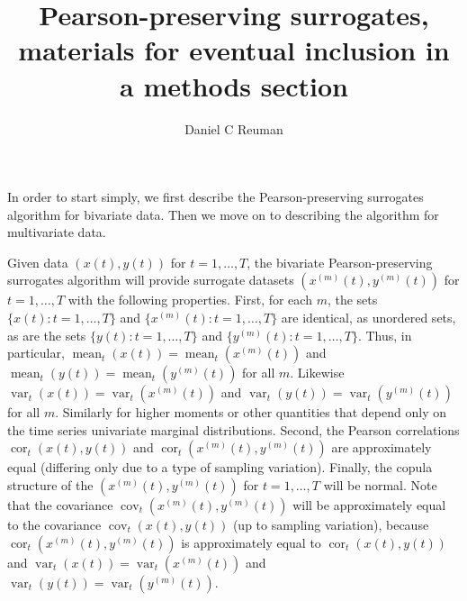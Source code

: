 \documentclass[letterpaper,11pt]{article}
\newcommand{\mean}{\operatorname{mean}}
\newcommand{\var}{\operatorname{var}}
\newcommand{\cor}{\operatorname{cor}}
\newcommand{\cov}{\operatorname{cov}}
\begin{document}
\title{Pearson-preserving surrogates, materials for eventual inclusion in a methods section}
\author{Daniel C Reuman}
\maketitle



\noindent In order to start simply, we first describe the Pearson-preserving surrogates 
algorithm for bivariate data. Then we move on to describing the algorithm
for multivariate data. 

Given data $(x(t),y(t))$ for $t=1,\ldots,T$, the bivariate
Pearson-preserving surrogates algorithm will provide surrogate datasets
$(x^{(m)}(t),y^{(m)}(t))$ for $t=1,\ldots,T$ with the following properties.
First, for each $m$,
the sets $\{x(t) : t=1,\ldots,T\}$ and $\{x^{(m)}(t) : t=1,\ldots,T\}$
are identical, as unordered sets, as are the sets 
$\{y(t) : t=1,\ldots,T\}$ and $\{y^{(m)}(t) : t=1,\ldots,T\}$. Thus,
in particular, $\mean_t(x(t))=\mean_t(x^{(m)}(t))$ and 
$\mean_t(y(t))=\mean_t(y^{(m)}(t))$ for all $m$. Likewise
$\var_t(x(t))=\var_t(x^{(m)}(t))$ and 
$\var_t(y(t))=\var_t(y^{(m)}(t))$ for all $m$. Similarly for
higher moments or other quantities that depend only on the time series
univariate marginal distributions.
Second, the Pearson correlations $\cor_t(x(t),y(t))$
and $\cor_t(x^{(m)}(t),y^{(m)}(t))$ are approximately equal (differing 
only due to a type of sampling variation). Finally, the copula 
structure of the $(x^{(m)}(t),y^{(m)}(t))$ for $t=1,\ldots,T$
will be normal. Note that the covariance
$\cov_t(x^{(m)}(t),y^{(m)}(t))$ will be approximately equal to the covariance
$\cov_t(x(t),y(t))$ (up to sampling variation), because 
$\cor_t(x^{(m)}(t),y^{(m)}(t))$ is approximately equal to 
$\cor_t(x(t),y(t))$ and $\var_t(x(t))=\var_t(x^{(m)}(t))$ and 
$\var_t(y(t))=\var_t(y^{(m)}(t))$.
\end{document}
